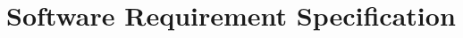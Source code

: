 \documentclass[12pt,a4paper]{article}
\begin{document}


\setcounter{page}{2}







\part{Software Requirement Specification}






\end{document}
